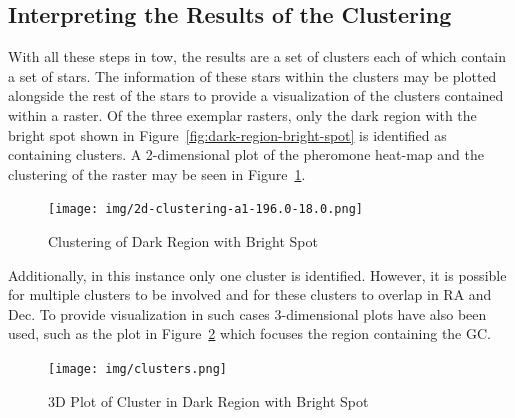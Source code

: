 \subsection{Interpreting the Results of the Clustering}
With all these steps in tow, the results are a set of clusters each of which contain a set of stars. The information of these stars within the clusters may be plotted alongside the rest of the stars to provide a visualization of the clusters contained within a raster. Of the three exemplar rasters, only the dark region with the bright spot shown in Figure~\ref{fig:dark-region-bright-spot} is identified as containing clusters. A 2-dimensional plot of the pheromone heat-map and the clustering of the raster may be seen in Figure~\ref{fig:example-2d-cluster}.
\begin{figure}[H]
    \centering
    \texttt{[image: img/2d-clustering-a1-196.0-18.0.png]}
    \caption{\label{fig:example-2d-cluster} Clustering of Dark Region with Bright Spot}
\end{figure}
Additionally, in this instance only one cluster is identified. However, it is possible for multiple clusters to be involved and for these clusters to overlap in $\text{RA}$ and $\text{Dec}$. To provide visualization in such cases 3-dimensional plots have also been used, such as the plot in Figure~\ref{fig:example-3d-cluster} which focuses the region containing the GC.
\vspace{-1em}
\begin{figure}[H]
    \centering
    \texttt{[image: img/clusters.png]}
    \caption{\label{fig:example-3d-cluster} 3D Plot of Cluster in Dark Region with Bright Spot}
\end{figure}

\newpage{}

